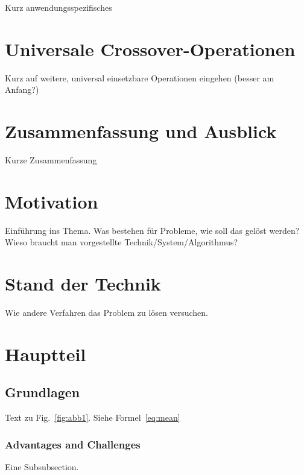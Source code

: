 \documentclass{llncs}
\begin{document}
Kurz anwendungsspezifisches

\section{Universale Crossover-Operationen}

Kurz auf weitere, universal einsetzbare Operationen eingehen (besser am Anfang?)

\section{Zusammenfassung und Ausblick}

Kurze Zusammenfassung

 






\newpage

\section{Motivation}
\label{sec:Motivation}
Einführung ins Thema. Was bestehen für Probleme, wie soll das gelöst werden? \\

Wieso braucht man vorgestellte Technik/System/Algorithmus?



\section{Stand der Technik} \label{sec:sdt}
%
Wie andere Verfahren das Problem zu lösen versuchen. \cite{OCBible}

\section{Hauptteil}
\label{sec:Hauptteil}

\subsection{Grundlagen}
\label{sec:Grundlagen}
Text zu Fig.~\ref{fig:abb1}. Siehe Formel~\ref{eq:mean}

\subsubsection{Advantages and Challenges}
Eine Subsubsection.
\end{document}
